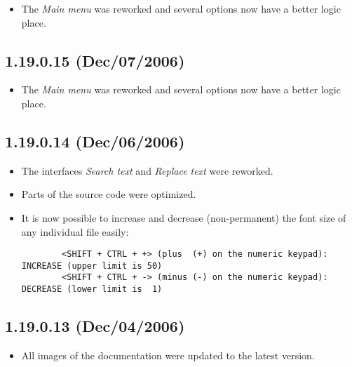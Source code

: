 \begin{itemize}
  \item The \textit{Main menu} was reworked and several options now
    have a better logic place.
\end{itemize}


\subsection{1.19.0.15 (Dec/07/2006)}

\begin{itemize}
  \item The \textit{Main menu} was reworked and several
    options now have a better logic place.
\end{itemize}


\subsection{1.19.0.14 (Dec/06/2006)}

\begin{itemize}
  \item The interfaces \textit{Search text} and \textit{Replace text} were reworked.
  \item Parts of the source code were optimized.
  \item It is now possible to increase and decrease (non-permanent)
    the font size of any individual file easily:

    \begin{footnotesize}
      \begin{verbatim}
        <SHIFT + CTRL + +> (plus  (+) on the numeric keypad): INCREASE (upper limit is 50)
        <SHIFT + CTRL + -> (minus (-) on the numeric keypad): DECREASE (lower limit is  1)
      \end{verbatim}
    \end{footnotesize}

\end{itemize}


\subsection{1.19.0.13 (Dec/04/2006)}

\begin{itemize}
  \item All images of the documentation were updated to the latest version.
\end{itemize}


